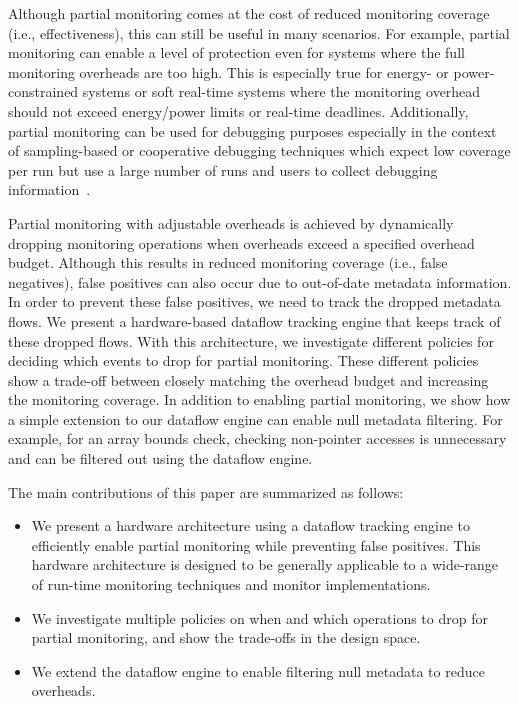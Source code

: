 Although partial monitoring comes at the cost of reduced monitoring coverage (i.e.,
effectiveness), this can still be useful in many scenarios.
For example, partial
monitoring can enable a level of protection even for systems where the full
monitoring overheads are too high. This is especially true for energy- or
power-constrained systems or soft real-time systems where the monitoring
overhead should not exceed energy/power limits or real-time deadlines.
Additionally, partial monitoring can be used for debugging purposes
especially in the context of sampling-based or cooperative debugging techniques
which expect low coverage per run but use a large number of runs and users to
collect debugging information~\cite{liblit-pldi05, chilimbi-asplos04,
greathouse-cgo11}. 

Partial monitoring with adjustable overheads is achieved by dynamically
dropping monitoring operations when overheads exceed a specified overhead
budget. Although this results in reduced monitoring coverage (i.e., false
negatives), false positives can also occur due to out-of-date metadata information.
In order to prevent these
false positives, we need to track the dropped metadata flows.  We present a
hardware-based dataflow tracking engine that keeps track of these dropped
flows. With this architecture, we investigate different policies for deciding
which events to drop for partial monitoring. These different policies show a
trade-off between closely matching the overhead budget and increasing the monitoring
coverage.
In addition to enabling partial monitoring, we show how a simple
extension to our dataflow engine can enable null metadata filtering.
For example, for an array bounds check, checking non-pointer accesses is
unnecessary and can be filtered out using the dataflow engine.

The main contributions of this paper are summarized as follows:
\begin{itemize}
  \item We present a hardware architecture using a dataflow tracking engine to
  efficiently enable partial monitoring while preventing false positives. This
  hardware architecture is designed to be generally applicable to a wide-range
  of run-time monitoring techniques and monitor implementations.
  \item We investigate multiple policies on when and which operations to drop 
  for partial monitoring, and show the trade-offs in the design space.
  \item We extend the dataflow engine to enable filtering null metadata to
  reduce overheads.
\end{itemize}


